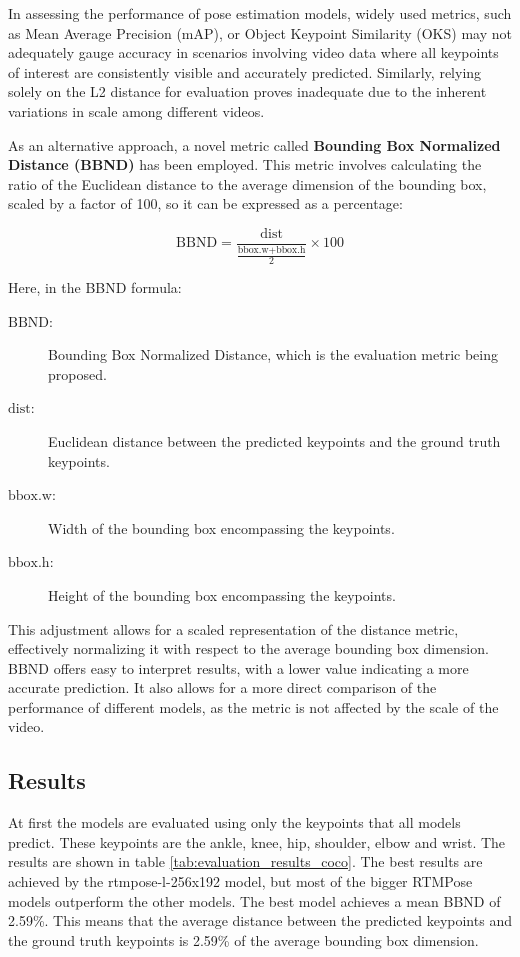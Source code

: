 In assessing the performance of pose estimation models, widely used metrics, such as Mean Average Precision (mAP), or Object Keypoint Similarity (OKS) may not adequately gauge accuracy in scenarios involving video data where all keypoints of interest are consistently visible and accurately predicted. Similarly, relying solely on the L2 distance for evaluation proves inadequate due to the inherent variations in scale among different videos.

As an alternative approach, a novel metric called \textbf{Bounding Box Normalized Distance (BBND)} has been employed. This metric involves calculating the ratio of the Euclidean distance to the average dimension of the bounding box, scaled by a factor of 100, so it can be expressed as a percentage:

$$ \text{BBND} = \frac{\text{dist}}{\frac{\text{bbox.w} + \text{bbox.h}}{2}} \times 100 $$

Here, in the BBND formula:
\begin{description}
    \item[$\text{BBND}$:] Bounding Box Normalized Distance, which is the evaluation metric being proposed.
    \item[$\text{dist}$:] Euclidean distance between the predicted keypoints and the ground truth keypoints.
    \item[$\text{bbox.w}$:] Width of the bounding box encompassing the keypoints.
    \item[$\text{bbox.h}$:] Height of the bounding box encompassing the keypoints.
\end{description}

This adjustment allows for a scaled representation of the distance metric, effectively normalizing it with respect to the average bounding box dimension. BBND offers easy to interpret results, with a lower value indicating a more accurate prediction. It also allows for a more direct comparison of the performance of different models, as the metric is not affected by the scale of the video.

\subsection{Results}
\label{evaluation_results}
At first the models are evaluated using only the keypoints that all models predict. These keypoints are the ankle, knee, hip, shoulder, elbow and wrist. The results are shown in table \ref{tab:evaluation_results_coco}. The best results are achieved by the rtmpose-l-256x192 model, but most of the bigger RTMPose models outperform the other models. The best model achieves a mean BBND of 2.59\%. This means that the average distance between the predicted keypoints and the ground truth keypoints is 2.59\% of the average bounding box dimension.

